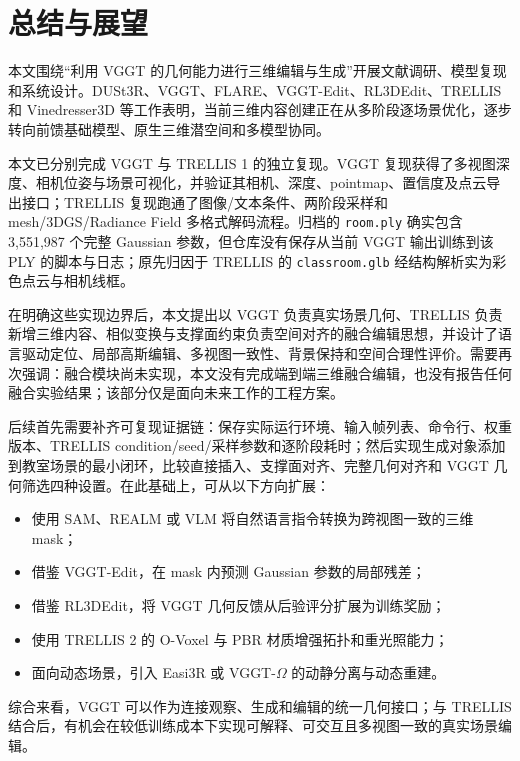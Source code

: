 \section{总结与展望}

本文围绕“利用 VGGT 的几何能力进行三维编辑与生成”开展文献调研、模型复现和系统设计。DUSt3R、VGGT、FLARE、VGGT-Edit、RL3DEdit、TRELLIS 和 Vinedresser3D 等工作表明，当前三维内容创建正在从多阶段逐场景优化，逐步转向前馈基础模型、原生三维潜空间和多模型协同。

本文已分别完成 VGGT 与 TRELLIS 1 的独立复现。VGGT 复现获得了多视图深度、相机位姿与场景可视化，并验证其相机、深度、pointmap、置信度及点云导出接口；TRELLIS 复现跑通了图像/文本条件、两阶段采样和 mesh/3DGS/Radiance Field 多格式解码流程。归档的 \texttt{room.ply} 确实包含 3,551,987 个完整 Gaussian 参数，但仓库没有保存从当前 VGGT 输出训练到该 PLY 的脚本与日志；原先归因于 TRELLIS 的 \texttt{classroom.glb} 经结构解析实为彩色点云与相机线框。

在明确这些实现边界后，本文提出以 VGGT 负责真实场景几何、TRELLIS 负责新增三维内容、相似变换与支撑面约束负责空间对齐的融合编辑思想，并设计了语言驱动定位、局部高斯编辑、多视图一致性、背景保持和空间合理性评价。需要再次强调：融合模块尚未实现，本文没有完成端到端三维融合编辑，也没有报告任何融合实验结果；该部分仅是面向未来工作的工程方案。

后续首先需要补齐可复现证据链：保存实际运行环境、输入帧列表、命令行、权重版本、TRELLIS condition/seed/采样参数和逐阶段耗时；然后实现生成对象添加到教室场景的最小闭环，比较直接插入、支撑面对齐、完整几何对齐和 VGGT 几何筛选四种设置。在此基础上，可从以下方向扩展：

\begin{itemize}[itemsep=0.04em, topsep=0.12em, parsep=0pt, partopsep=0pt]
  \item 使用 SAM、REALM 或 VLM 将自然语言指令转换为跨视图一致的三维 mask；
  \item 借鉴 VGGT-Edit，在 mask 内预测 Gaussian 参数的局部残差；
  \item 借鉴 RL3DEdit，将 VGGT 几何反馈从后验评分扩展为训练奖励；
  \item 使用 TRELLIS 2 的 O-Voxel 与 PBR 材质增强拓扑和重光照能力；
  \item 面向动态场景，引入 Easi3R 或 VGGT-$\Omega$ 的动静分离与动态重建。
\end{itemize}

综合来看，VGGT 可以作为连接观察、生成和编辑的统一几何接口；与 TRELLIS 结合后，有机会在较低训练成本下实现可解释、可交互且多视图一致的真实场景编辑。

